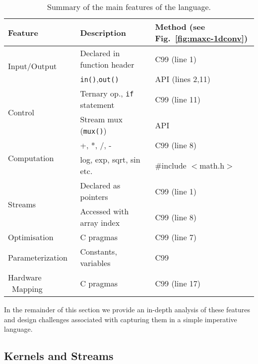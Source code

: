 \begin{table}[!h]
  \centering
  \renewcommand{\arraystretch}{1.5}
  \begin{tabularx}{\textwidth}{p{3.5cm}|X|X}
    \hline
    \bf{Feature}                   & \bf{Description}                   & \bf{Method (see Fig.~\ref{fig:maxc-1dconv})} \\
    \hline\hline
    \multirow{2}{*}{Input/Output}         & Declared in function header          & C99 (line 1)                                 \\\cline{2-3}       & \texttt{in()},\texttt{out()}  & \FAST{} API (lines 2,11) \\
    \hline
    \multirow{2}{*}{Control}     & Ternary op., \texttt{if} statement & C99 (line 11)                                \\\cline{2-3}      & Stream mux (\texttt{mux()})       & \FAST{} API  \\
    \hline
    \multirow{2}{*}{Computation} & +, *, /, -                         & C99 (line 8)                           \\\cline{2-3} & log, exp, sqrt, sin etc.  & \#include $<$math.h$>$  \\
    \hline
    \multirow{2}{*}{Streams}     & Declared as pointers               & C99 (line 1)                                 \\\cline{2-3}       & Accessed with array index & C99 (line 8) \\
    \hline
    Optimisation                 & C pragmas                   & C99 (line 7)                                 \\
    \hline
    Parameterization             & Constants, variables                   & C99                                          \\
    \hline
    Hardware \  Mapping                  & C pragmas                   & C99 (line 17)                                \\
  \end{tabularx}
  \caption{Summary of the main features of the \FAST{} language.}
  \label{table:maxc-features}
\end{table}

In the remainder of this section we provide an in-depth analysis of
these features and design challenges associated with capturing them in
a simple imperative language.

\subsection{Kernels and Streams}

